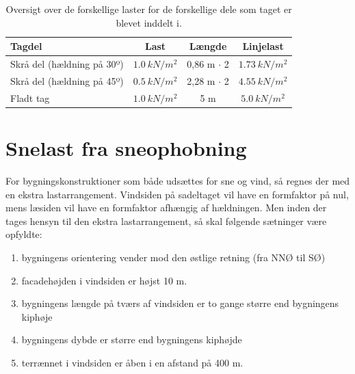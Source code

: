 \begin{table}[H]
\centering
\begin{tabular}{|l|c|c|c|}
\hline
\textbf{Tagdel}            & \textbf{Last} & \textbf{Længde} & \textbf{Linjelast} \\ \hline
Skrå del (hældning på 30º) & $\SI{1,0}{kN/m^2}$                      & 0,86 m $\cdot$ 2              & $\SI{1,73}{kN/m^2}$                                                                                                               \\ \hline
Skrå del (hældning på 45º) & $\SI{0,5}{kN/m^2}$                                     & 2,28 m $\cdot$ 2               & $\SI{4,55}{kN/m^2}$                                                                                                              \\ \hline
Fladt tag                  & $\SI{1,0}{kN/m^2}$                     &  5 m               & $\SI{5,0}{kN/m^2}$                                                                                                               \\ \hline
\end{tabular}
\caption{Oversigt over de forskellige laster for de forskellige dele som taget er blevet inddelt i.}
\label{tab:SLT2}
\end{table}


\section{Snelast fra sneophobning}
For bygningskonstruktioner som både udsættes for sne og vind, så regnes der med en ekstra lastarrangement. Vindsiden på sadeltaget vil have en formfaktor på nul, mens læsiden vil have en formfaktor afhængig af hældningen. Men inden der tages hensyn til den ekstra lastarrangement, så skal følgende sætninger være opfyldte:





\begin{enumerate}
\item bygningens orientering vender mod den østlige retning (fra NNØ til SØ)
\item facadehøjden i vindsiden er højst 10 m.
\item bygningens længde på tværs af vindsiden er to gange større end bygningens kiphøje
\item bygningens dybde er større end bygningens kiphøjde
\item terrænnet i vindsiden er åben i en afstand på 400 m.
\end{enumerate}

